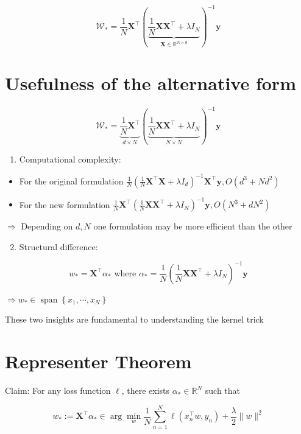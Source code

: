 \documentclass[10pt]{article}
\begin{document}
$$
\mathcal{W}_{*}=\frac{1}{N} \mathbf{X}^{\top}(\underbrace{\frac{1}{N} \mathbf{X X}^{\top}+\lambda I_{N}}_{\mathbf{X} \in \mathbb{R}^{N \times d}})^{-1} \mathbf{y}
$$

\section*{Usefulness of the alternative form}
$$
\mathcal{W}_{*}=\underbrace{\frac{1}{N} \mathbf{X}^{\top}}_{d \times N}(\underbrace{\frac{1}{N} \mathbf{X X}^{\top}+\lambda I_{N}}_{N \times N})^{-1} \mathbf{y}
$$

\begin{enumerate}
  \item Computational complexity:
\end{enumerate}

\begin{itemize}
  \item For the original formulation $\frac{1}{N}\left(\frac{1}{N} \mathbf{X}^{\top} \mathbf{X}+\lambda I_{d}\right)^{-1} \mathbf{X}^{\top} \mathbf{y}, O\left(d^{3}+N d^{2}\right)$
  \item For the new formulation $\frac{1}{N} \mathbf{X}^{\top}\left(\frac{1}{N} \mathbf{X} \mathbf{X}^{\top}+\lambda I_{N}\right)^{-1} \mathbf{y}, O\left(N^{3}+d N^{2}\right)$
\end{itemize}

$\Rightarrow$ Depending on $d, N$ one formulation may be more efficient than the other

\begin{enumerate}
  \setcounter{enumi}{1}
  \item Structural difference:
\end{enumerate}

$$
w_{*}=\mathbf{X}^{\top} \alpha_{*} \text { where } \alpha_{*}=\frac{1}{N}\left(\frac{1}{N} \mathbf{X} \mathbf{X}^{\top}+\lambda I_{N}\right)^{-1} \mathbf{y}
$$

$\Rightarrow w_{*} \in \operatorname{span}\left\{x_{1}, \cdots, x_{N}\right\}$

These two insights are fundamental to understanding the kernel trick

\section*{Representer Theorem}
Claim: For any loss function $\ell$, there exists $\alpha_{*} \in \mathbb{R}^{N}$ such that

$$
w_{*}:=\mathbf{X}^{\top} \alpha_{*} \in \arg \min _{w} \frac{1}{N} \sum_{n=1}^{N} \ell\left(x_{n}^{\top} w, y_{n}\right)+\frac{\lambda}{2}\|w\|^{2}
$$
\end{document}
